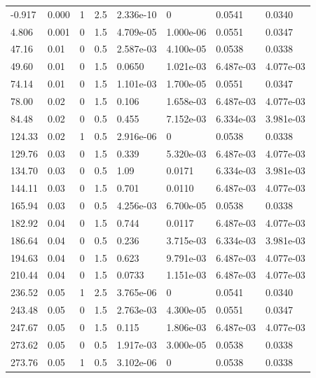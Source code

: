 \documentclass[preview]{standalone}
\begin{document}
{{\begin{tabular}{L{1.2cm}C{1.2cm} C{0.3cm}C{0.5cm} C{1.4cm}C{1.4cm} C{1.4cm}C{1.4cm}}
  -0.917  &  0.000  & 1     & 2.5 &  2.336e-10  & 0  & 0.0541 &  0.0340   \\ 
  4.806  &  0.001  & 0     & 1.5 &  4.709e-05  & 1.000e-06  & 0.0551 &  0.0347   \\ 
  47.16  &  0.01  & 0     & 0.5 &  2.587e-03  & 4.100e-05  & 0.0538 &  0.0338   \\ 
  49.60  &  0.01  & 0     & 1.5 &  0.0650  & 1.021e-03  & 6.487e-03 &  4.077e-03   \\ 
  74.14  &  0.01  & 0     & 1.5 &  1.101e-03  & 1.700e-05  & 0.0551 &  0.0347   \\ 
  78.00  &  0.02  & 0     & 1.5 &  0.106  & 1.658e-03  & 6.487e-03 &  4.077e-03   \\ 
  84.48  &  0.02  & 0     & 0.5 &  0.455  & 7.152e-03  & 6.334e-03 &  3.981e-03   \\ 
  124.33  &  0.02  & 1     & 0.5 &  2.916e-06  & 0  & 0.0538 &  0.0338   \\ 
  129.76  &  0.03  & 0     & 1.5 &  0.339  & 5.320e-03  & 6.487e-03 &  4.077e-03   \\ 
  134.70  &  0.03  & 0     & 0.5 &  1.09  & 0.0171  & 6.334e-03 &  3.981e-03   \\ 
  144.11  &  0.03  & 0     & 1.5 &  0.701  & 0.0110  & 6.487e-03 &  4.077e-03   \\ 
  165.94  &  0.03  & 0     & 0.5 &  4.256e-03  & 6.700e-05  & 0.0538 &  0.0338   \\ 
  182.92  &  0.04  & 0     & 1.5 &  0.744  & 0.0117  & 6.487e-03 &  4.077e-03   \\ 
  186.64  &  0.04  & 0     & 0.5 &  0.236  & 3.715e-03  & 6.334e-03 &  3.981e-03   \\ 
  194.63  &  0.04  & 0     & 1.5 &  0.623  & 9.791e-03  & 6.487e-03 &  4.077e-03   \\ 
  210.44  &  0.04  & 0     & 1.5 &  0.0733  & 1.151e-03  & 6.487e-03 &  4.077e-03   \\ 
  236.52  &  0.05  & 1     & 2.5 &  3.765e-06  & 0  & 0.0541 &  0.0340   \\ 
  243.48  &  0.05  & 0     & 1.5 &  2.763e-03  & 4.300e-05  & 0.0551 &  0.0347   \\ 
  247.67  &  0.05  & 0     & 1.5 &  0.115  & 1.806e-03  & 6.487e-03 &  4.077e-03   \\ 
  273.62  &  0.05  & 0     & 0.5 &  1.917e-03  & 3.000e-05  & 0.0538 &  0.0338   \\ 
  273.76  &  0.05  & 1     & 0.5 &  3.102e-06  & 0  & 0.0538 &  0.0338   \\ 

\end{tabular}}}
\end{document}
